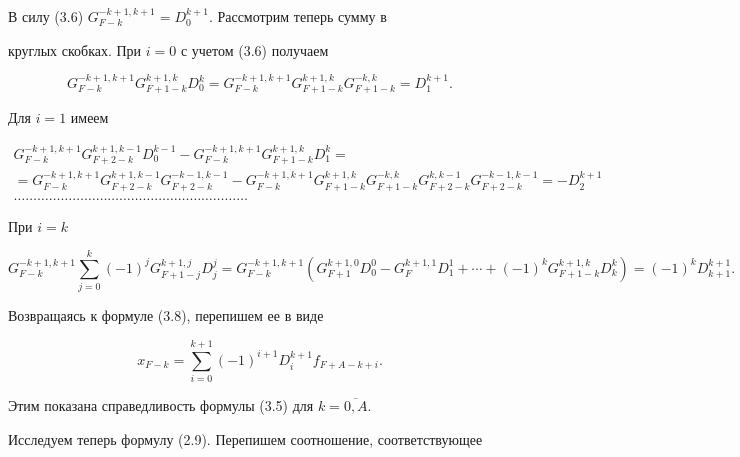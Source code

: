 В силу (3.6) $G_{F-k}^{-k+1,k+1}=D_{0}^{k+1}$. Рассмотрим теперь сумму в


круглых скобках. При $i=0$ с учетом (3.6) получаем


$$


G_{F-k}^{-k+1,k+1}G_{F+1-k}^{k+1,k}D_{0}^{k}=


G_{F-k}^{-k+1,k+1}G_{F+1-k}^{k+1,k}G_{F+1-k}^{-k,k}=D_{1}^{k+1}.


$$


Для $i=1$ имеем


\begin{multline*}


G_{F-k}^{-k+1,k+1}G_{F+2-k}^{k+1,k-1}D_{0}^{k-1}-


G_{F-k}^{-k+1,k+1}G_{F+1-k}^{k+1,k}D_{1}^{k} =\\


%


=G_{F-k}^{-k+1,k+1}G_{F+2-k}^{k+1,k-1}G_{F+2-k}^{-k-1,k-1}


-G_{F-k}^{-k+1,k+1}G_{F+1-k}^{k+1,k}G_{F+1-k}^{-k,k}


G_{F+2-k}^{k,k-1}G_{F+2-k}^{-k-1,k-1}=-D_{2}^{k+1} \\


%


\dotsc\dotsc\dotsc\dotsc\dotsc\dotsc\dotsc\dotsc\dotsc\dotsc\dotsc\dotsc


\dotsc\dotsc\dotsc\dotsc\dotsc\dotsc\dotsc\dotsc


\end{multline*}


При $i=k$


$$


G_{F-k}^{-k+1,k+1}\sum\limits_{j=0}^{k}


(-1)^{j}G_{F+1-j}^{k+1,j}D_{j}^{j}


=G_{F-k}^{-k+1,k+1}(G_{F+1}^{k+1,0}D_{0}^{0}-G_{F}^{k+1,1}D_{1}^{1}+


\dotsb+(-1)^{k}G_{F+1-k}^{k+1,k}D_{k}^{k})=(-1)^{k}D_{k+1}^{k+1}.


$$


Возвращаясь к формуле (3.8), перепишем ее в виде


$$


x_{F-k}=\sum_{i=0}^{k+1}(-1)^{i+1}D_{i}^{k+1}f_{F+A-k+i}.


$$


Этим показана справедливость формулы (3.5) для $k=\overline{0,A}$.





Исследуем теперь формулу (2.9). Перепишем соотношение, соответствующее


